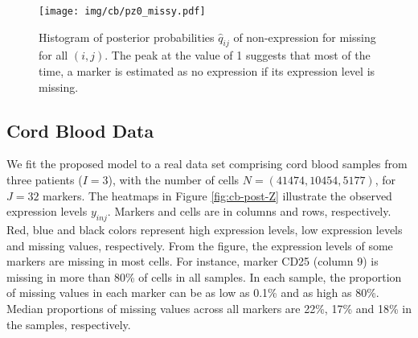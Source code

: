 \documentclass[12pt,]{article}
\begin{document}
\begin{figure}[th!]
\begin{center}
  \texttt{[image: img/cb/pz0\_missy.pdf]}%
  \caption{ %
    Histogram of posterior
    probabilities $\hat{q}_{ij}$ of non-expression for missing for all $(i,j)$.
    The peak at the value of 1 suggests that most of the
    time, a marker is estimated as no expression if its expression level is
    missing.}
  \label{fig:hist-pz0-missy}
\end{center}
\end{figure}



\subsection{Cord Blood Data}\label{sec:CB-real}
We fit the proposed model to a real data set comprising cord blood samples from
three patients ($I=3$), with the number of cells $N=(41474, 10454, 5177)$, for
$J=32$ markers. The heatmaps in Figure \ref{fig:cb-post-Z} illustrate the
observed expression levels $y_{inj}$.  Markers and cells are in columns and
rows, respectively. 
% 
%
Red, blue and black colors represent high expression levels, low expression
levels and missing values, respectively.  From the figure, the expression
levels of some markers are missing in most cells. For instance, marker CD25
(column 9) is missing in more than 80\% of cells in all samples.
In each sample, the proportion of missing values in each marker can be as low
as 0.1\% and as high as 80\%.  Median proportions of missing values across all
markers are 22\%, 17\% and 18\% in the samples, respectively.
\end{document}

